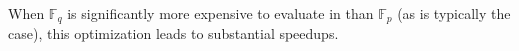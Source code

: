 \documentclass{article}
\newcommand{\Fp}{\mathbb F_p}
\newcommand{\Fq}{\mathbb F_q}
\begin{document}
When $\Fq$ is significantly more expensive to evaluate in than $\Fp$ (as is typically the case), this optimization leads to substantial speedups.








\end{document}
